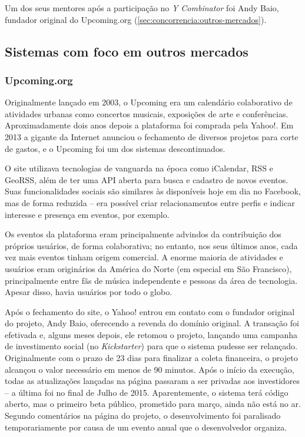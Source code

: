 \documentclass[12pt,a4paper,twoside,hyphens,english,brazil]{abntex2}
\begin{document}
Um dos seus mentores após a participação no \emph{Y Combinator} foi Andy Baio, fundador original do Upcoming.org (\autoref{sec:concorrencia:outros-mercados}).

\subsection{Sistemas com foco em outros mercados} \label{sec:concorrencia:outros-mercados}


\subsubsection*{Upcoming.org}
Originalmente lançado em 2003, o Upcoming era um calendário colaborativo de atividades urbanas como concertos musicais, exposições de arte e conferências.\cite{upcoming-tnw} Aproximadamente dois anos depois a plataforma foi comprada pela Yahoo!. Em 2013 a gigante da Internet anunciou o fechamento de diversos projetos para corte de gastos, e o Upcoming foi um dos sistemas descontinuados.\cite{upcoming-fechado}

O site utilizava tecnologias de vanguarda na época como iCalendar, RSS e GeoRSS, além de ter uma API aberta para busca e cadastro de novos eventos. Suas funcionalidades sociais são similares às disponíveis hoje em dia no Facebook, mas de forma reduzida -- era possível criar relacionamentos entre perfis e indicar interesse e presença em eventos, por exemplo.

Os eventos da plataforma eram principalmente advindos da contribuição dos próprios usuários, de forma colaborativa; no entanto, nos seus últimos anos, cada vez mais eventos tinham origem comercial. A enorme maioria de atividades e usuários eram originários da América do Norte (em especial em São Francisco), principalmente entre fãs de música independente e pessoas da área de tecnologia. Apesar disso, havia usuários por todo o globo.\cite{upcoming-wikipedia}

Após o fechamento do site, o Yahoo! entrou em contato com o fundador original do projeto, Andy Baio, oferecendo a revenda do domínio original. A transação foi efetivada e, alguns meses depois, ele retomou o projeto, lançando uma campanha de investimento social (no \emph{Kickstarter}) para que o sistema pudesse ser relançado. Originalmente com o prazo de 23 dias para finalizar a coleta financeira, o projeto alcançou o valor necessário em menos de 90 minutos\cite{upcoming-90-min}. Após o início da execução, todas as atualizações lançadas na página passaram a ser privadas aos investidores -- a última foi no final de Julho de 2015. Aparentemente, o sistema terá código aberto, mas o primeiro beta público, prometido para março, ainda não está no ar. Segundo comentários na página do projeto, o desenvolvimento foi paralisado temporariamente por causa de um evento anual que o desenvolvedor organiza\cite{upcoming-xoxo}.
\end{document}
